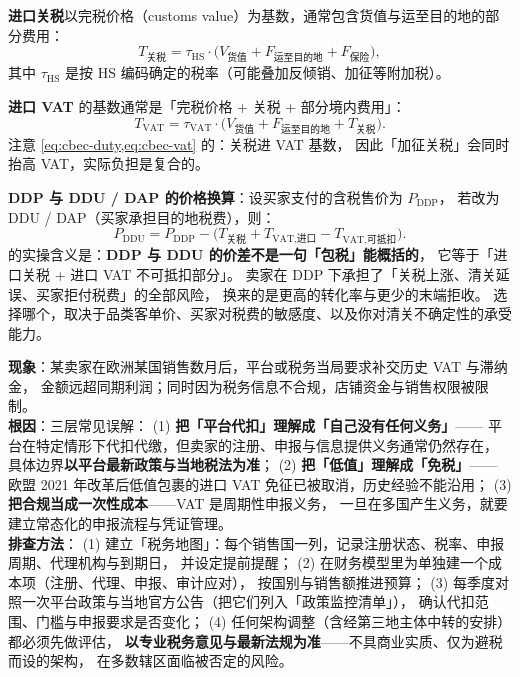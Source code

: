 \begin{formulacard}
\textbf{进口关税}以完税价格（customs value）为基数，通常包含货值与运至目的地的部分费用：
\begin{equation}
T_{\text{关税}} = \tau_{\text{HS}} \cdot \bigl(V_{\text{货值}} + F_{\text{运至目的地}} + F_{\text{保险}}\bigr) ,
\label{eq:cbec-duty}
\end{equation}
其中 $\tau_{\text{HS}}$ 是按 HS 编码确定的税率（可能叠加反倾销、加征等附加税）。

\textbf{进口 VAT} 的基数通常是「完税价格 + 关税 + 部分境内费用」：
\begin{equation}
T_{\text{VAT}} = \tau_{\text{VAT}} \cdot \bigl(V_{\text{货值}} + F_{\text{运至目的地}} + T_{\text{关税}}\bigr) .
\label{eq:cbec-vat}
\end{equation}
注意 \cref{eq:cbec-duty,eq:cbec-vat} 的：关税进 VAT 基数，
因此「加征关税」会同时抬高 VAT，实际负担是复合的。

\textbf{DDP 与 DDU / DAP 的价格换算}：设买家支付的含税售价为 $P_{\text{DDP}}$，
若改为 DDU / DAP（买家承担目的地税费），则：
\begin{equation}
P_{\text{DDU}} = P_{\text{DDP}} - \bigl(T_{\text{关税}} + T_{\text{VAT,进口}} - T_{\text{VAT,可抵扣}}\bigr) .
\label{eq:cbec-ddp}
\end{equation}
 的实操含义是：\textbf{DDP 与 DDU 的价差不是一句「包税」能概括的}，
它等于「进口关税 + 进口 VAT 不可抵扣部分」。
卖家在 DDP 下承担了「关税上涨、清关延误、买家拒付税费」的全部风险，
换来的是更高的转化率与更少的末端拒收。
选择哪个，取决于品类客单价、买家对税费的敏感度、以及你对清关不确定性的承受能力。
\end{formulacard}

\begin{pitfall}
\textbf{现象}：某卖家在欧洲某国销售数月后，平台或税务当局要求补交历史 VAT 与滞纳金，
金额远超同期利润；同时因为税务信息不合规，店铺资金与销售权限被限制。
\\
\textbf{根因}：三层常见误解：
(1) \textbf{把「平台代扣」理解成「自己没有任何义务」}——
平台在特定情形下代扣代缴，但卖家的注册、申报与信息提供义务通常仍然存在，
具体边界\textbf{以平台最新政策与当地税法为准}；
(2) \textbf{把「低值」理解成「免税」}——
欧盟 2021 年改革后低值包裹的进口 VAT 免征已被取消，历史经验不能沿用；
(3) \textbf{把合规当成一次性成本}——VAT 是周期性申报义务，
一旦在多国产生义务，就要建立常态化的申报流程与凭证管理。
\\
\textbf{排查方法}：
(1) 建立「税务地图」：每个销售国一列，记录注册状态、税率、申报周期、代理机构与到期日，
并设定提前提醒；
(2) 在财务模型里为单独建一个成本项（注册、代理、申报、审计应对），
按国别与销售额推进预算；
(3) 每季度对照一次平台政策与当地官方公告（把它们列入「政策监控清单」），
确认代扣范围、门槛与申报要求是否变化；
(4) 任何架构调整（含经第三地主体中转的安排）都必须先做评估，
\textbf{以专业税务意见与最新法规为准}——不具商业实质、仅为避税而设的架构，
在多数辖区面临被否定的风险。
\end{pitfall}

